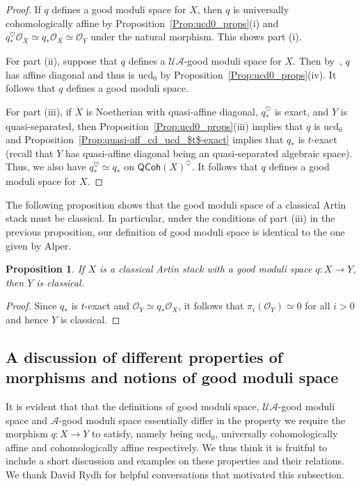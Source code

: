 \documentclass[a4paper,twoside,11pt]{amsart}
\theoremstyle{plain}
\newtheorem{proposition}[theorem]{Proposition}
\theoremstyle{definition}
\theoremstyle{remark}
\numberwithin{equation}{section}
\newcommand\sA{\mathcal{A}}
\newcommand{\ucd}{$\mathrm{ucd}_{0}$\xspace}
\newcommand{\QCoh}{\mathsf{QCoh}}
\newcommand{\oO}{\mathcal{O}}
\begin{document}
\begin{proof}
    If $q$ defines a good moduli space for $X$, then $q$ is universally cohomologically affine by Proposition~\ref{Prop:ucd0_props}(i) and $q_\ast^\heartsuit \oO_X \simeq q_\ast \oO_X \simeq \oO_Y$ under the natural morphism. This shows part (i).

    For part (ii), suppose that $q$ defines a $\mathcal{U}\sA$-good moduli space for $X$. Then by~\cite[Theorem~6.1]{AHR2}, $q$ has affine diagonal and thus is \ucd by Proposition~\ref{Prop:ucd0_props}(iv). It follows that $q$ defines a good moduli space.

    For part (iii), if $X$ is Noetherian with quasi-affine diagonal, $q_\ast^\heartsuit$ is exact, and $Y$ is quasi-separated, then Proposition~\ref{Prop:ucd0_props}(iii) implies that $q$ is \ucd and Proposition~\ref{Prop:quasi-aff_cd_ucd_$t$-exact} implies that $q_*$ is $t$-exact (recall that $Y$ has quasi-affine diagonal being an quasi-separated algebraic space). Thus, we also have $q_\ast^\heartsuit \simeq q_\ast$ on $\QCoh(X)^{\heartsuit}$. It follows that $q$ defines a good moduli space for $X$.
\end{proof}

The following proposition shows that the good moduli space of a classical Artin stack must be classical. In particular, under the conditions of part (iii) in the previous proposition, our definition of good moduli space is identical to the one given by Alper.

\begin{proposition} \label{Prop:Classical stack has classical GMS}
    If $X$ is a classical Artin stack with a good moduli space $q \colon X \to Y$, then $Y$ is classical. 
\end{proposition}

\begin{proof}
    Since $q_*$ is $t$-exact and $\oO_Y \simeq q_\ast \oO_X$, it follows that $\pi_i(\oO_Y) \simeq 0$ for all $i>0$ and hence $Y$ is classical.
\end{proof}

\subsection{A discussion of different properties of morphisms and notions of good moduli space} \label{subsection:different notions of morphisms and gms}

It is evident that that the definitions of good moduli space, $\mathcal{U}\sA$-good moduli space and $\sA$-good moduli space essentially differ in the property we require the morphism $q \colon X \to Y$ to satisfy, namely being \ucd, universally cohomologically affine and cohomologically affine respectively. We thus think it is fruitful to include a short discussion and examples on these properties and their relations. We thank David Rydh for helpful conversations that motivated this subsection.
\end{document}
